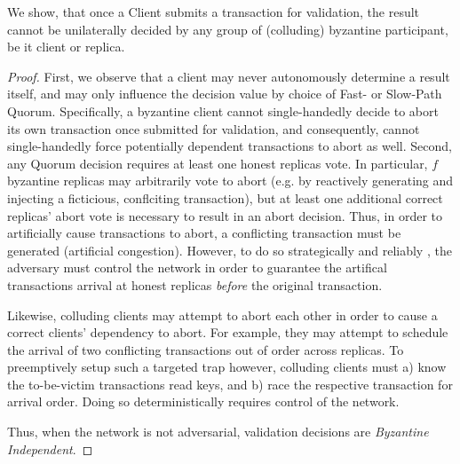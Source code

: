 We show, that once a Client submits a transaction for validation, the result cannot be unilaterally decided by any group of (colluding) byzantine participant, be it client or replica.
\begin{proof}

First, we observe that a client may never autonomously determine a result itself, and may only influence the decision value by choice of Fast- or Slow-Path Quorum. Specifically, a byzantine client cannot single-handedly decide to abort its own transaction once submitted for validation, and consequently, cannot single-handedly force potentially dependent transactions to abort as well. 
Second, any Quorum decision requires at least one honest replicas vote. In particular, $f$ byzantine replicas may arbitrarily vote to abort (e.g. by reactively generating and injecting a ficticious, conflciting transaction), but at least one additional correct replicas' abort vote is necessary to result in an abort decision. 
Thus, in order to artificially cause transactions to abort, a conflicting transaction must be generated (artificial congestion). However, to do so strategically and reliably , the adversary must control the network in order to guarantee the artifical transactions arrival at honest replicas \textit{before} the original transaction. 

Likewise, colluding clients may attempt to abort each other in order to cause a correct clients' dependency to abort. For example, they may attempt to schedule the arrival of two conflicting transactions out of order across replicas. To preemptively setup such a targeted trap however, colluding clients must a) know the to-be-victim transactions read keys, and b) race the respective transaction for arrival order. Doing so deterministically requires control of the network.

Thus, when the network is not adversarial, validation decisions are \textit{Byzantine Independent}.



\end{proof}


